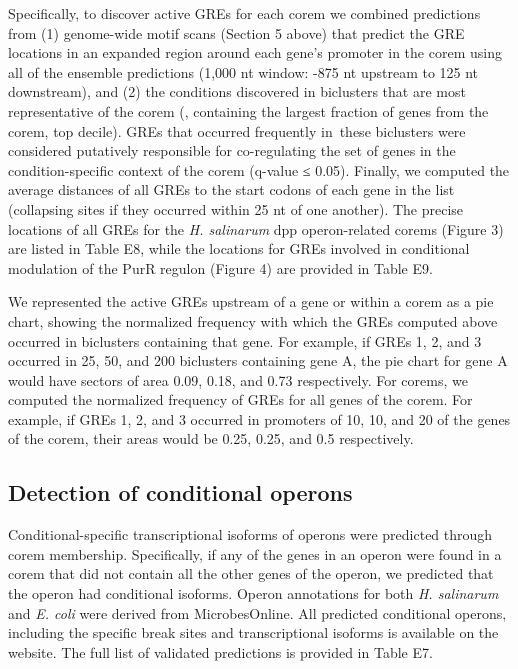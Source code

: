 Specifically, to discover active GREs for each corem we combined
predictions from (1) genome-wide motif scans (Section 5 above) that
predict the GRE locations in an expanded region around each gene’s
promoter in the corem using all of the ensemble predictions (1,000 nt
window: -875 nt upstream to 125 nt downstream), and (2) the conditions
discovered in biclusters that are most representative of the corem
(\ie, containing the largest fraction of genes from the corem, top
decile). GREs that occurred frequently in these biclusters were
considered putatively responsible for co-regulating the set of genes
in the condition-specific context of the corem (q-value ≤
0.05). Finally, we computed the average distances of all GREs to the
start codons of each gene in the list (collapsing sites if they
occurred within 25 nt of one another). The precise locations of all
GREs for the {\it H. salinarum} dpp operon-related corems (Figure 3) are
listed in Table E8, while the locations for GREs involved in
conditional modulation of the PurR regulon (Figure 4) are provided in
Table E9.

We represented the active GREs upstream of a gene or within a corem as
a pie chart, showing the normalized frequency with which the GREs
computed above occurred in biclusters containing that gene. For
example, if GREs 1, 2, and 3 occurred in 25, 50, and 200 biclusters
containing gene A, the pie chart for gene A would have sectors of area
0.09, 0.18, and 0.73 respectively. For corems, we computed the
normalized frequency of GREs for all genes of the corem. For example,
if GREs 1, 2, and 3 occurred in promoters of 10, 10, and 20 of the
genes of the corem, their areas would be 0.25, 0.25, and 0.5
respectively.

\subsection{Detection of conditional operons}

Conditional-specific transcriptional isoforms of operons were
predicted through corem membership. Specifically, if any of the genes
in an operon were found in a corem that did not contain all the other
genes of the operon, we predicted that the operon had conditional
isoforms. Operon annotations for both {\it H. salinarum} and {\it E. coli} were
derived from MicrobesOnline. All predicted conditional operons,
including the specific break sites and transcriptional isoforms is
available on the website. The full list of validated predictions is
provided in Table E7.

